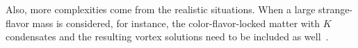 \documentclass[12pt]{article}
\begin{document}
Also, more complexities come from the realistic situations. When a large strange-flavor mass is considered, for instance, the color-flavor-locked matter with $K$ condensates and the
resulting vortex solutions need to be included as well~\cite{kaplan2002charged,buckley2002superconducting}.%
\end{document}
